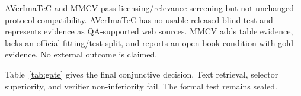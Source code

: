 AVerImaTeC and MMCV pass licensing/relevance screening but not unchanged-protocol compatibility. AVerImaTeC has no usable released blind test and represents evidence as QA-supported web sources. MMCV adds table evidence, lacks an official fitting/test split, and reports an open-book condition with gold evidence. No external outcome is claimed.

Table~\ref{tab:gate} gives the final conjunctive decision. Text retrieval, selector superiority, and verifier non-inferiority fail. The formal test remains sealed.

\begin{table}[t]
\centering
\caption{Final development gate. Every condition is required.}
\label{tab:gate}
\small

\end{table}
